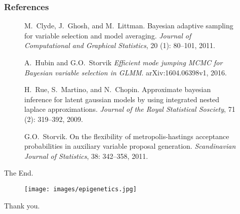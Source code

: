 \documentclass{beamer}
\begin{document}
\begin{frame}
\frametitle{References}

\begin{figure}
\small
\begin{thebibliography}{\small}
M.~Clyde, J.~Ghosh, and M.~Littman.
\newblock Bayesian adaptive sampling for variable selection and model
  averaging.
\newblock \emph{Journal of Computational and Graphical Statistics}, 20
  (1): 80--101, 2011.
  
A.~Hubin and G.O.~Storvik
\newblock \emph{{E}fficient mode jumping {MCMC} for {B}ayesian variable selection in {GLMM}}.
\newblock arXiv:1604.06398v1, 2016.

H.~Rue, S.~Martino, and N.~Chopin.
\newblock Approximate bayesian inference for latent gaussian models by using
  integrated nested laplace approximations.
\newblock \emph{Journal of the Royal Statistical Sosciety}, 71
  (2): 319--392, 2009.

G.O.~Storvik.
\newblock On the flexibility of metropolis-hastings acceptance probabilities in
  auxiliary variable proposal generation.
\newblock \emph{Scandinavian Journal of Statistics}, 38: 342--358,
  2011.


\end{thebibliography}
\end{figure}

\end{frame}

\begin{frame}
\Huge{\centerline{The End.}}
\begin{center}

\begin{figure}
\texttt{[image: images/epigenetics.jpg]}
\end{figure}


Thank you.
\end{center}
\end{frame}
\end{document}
